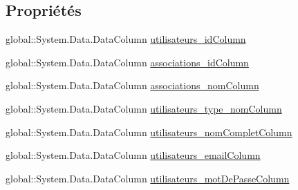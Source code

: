 \subsection*{Propriétés}
\begin{DoxyCompactItemize}
\item 
global\+::\+System.\+Data.\+Data\+Column \hyperlink{classforma_1_1formadb_data_set_1_1view__utilisateurs__associations_data_table_ada77d0df4b57eb402ba92ec9de72041c}{utilisateurs\+\_\+id\+Column}
\item 
global\+::\+System.\+Data.\+Data\+Column \hyperlink{classforma_1_1formadb_data_set_1_1view__utilisateurs__associations_data_table_af505c2a1c7cf0f202c985b4725eb86c8}{associations\+\_\+id\+Column}
\item 
global\+::\+System.\+Data.\+Data\+Column \hyperlink{classforma_1_1formadb_data_set_1_1view__utilisateurs__associations_data_table_a8d65d7f8494ead18d7f8274a3a31e5f1}{associations\+\_\+nom\+Column}
\item 
global\+::\+System.\+Data.\+Data\+Column \hyperlink{classforma_1_1formadb_data_set_1_1view__utilisateurs__associations_data_table_a99987ca770cca70f7ca4eaa70d89ea86}{utilisateurs\+\_\+type\+\_\+nom\+Column}
\item 
global\+::\+System.\+Data.\+Data\+Column \hyperlink{classforma_1_1formadb_data_set_1_1view__utilisateurs__associations_data_table_adfb10f3ccd43622995bed0c44adafd37}{utilisateurs\+\_\+nom\+Complet\+Column}
\item 
global\+::\+System.\+Data.\+Data\+Column \hyperlink{classforma_1_1formadb_data_set_1_1view__utilisateurs__associations_data_table_a8b9e567717ee4c648070f2c2f3a3ae60}{utilisateurs\+\_\+email\+Column}
\item 
global\+::\+System.\+Data.\+Data\+Column \hyperlink{classforma_1_1formadb_data_set_1_1view__utilisateurs__associations_data_table_a70ee48e90ceec624f18f98f079fd1820}{utilisateurs\+\_\+mot\+De\+Passe\+Column}
\item 

\end{DoxyCompactItemize}
